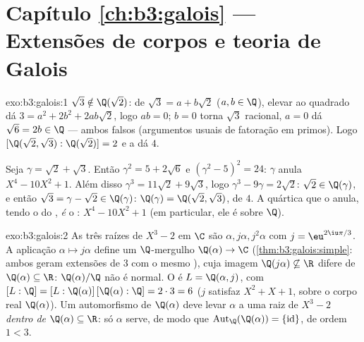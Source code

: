 \section*{Capítulo \ref{ch:b3:galois} --- Extensões de corpos e teoria de
Galois}

\begin{solution}{exo:b3:galois:1}
$\sqrt3 \notin \Q(\sqrt2)$: de $\sqrt3 = a + b\sqrt2$ ($a, b
\in \Q$), elevar ao quadrado dá $3 = a^2 + 2b^2 + 2ab\sqrt2$, logo $ab =
0$; $b = 0$
torna $\sqrt3$ racional, $a = 0$ dá $\sqrt6 = 2b
\in \Q$ --- ambos falsos
(argumentos usuais de fatoração em primos). Logo $[\Q(\sqrt2,\sqrt3) : \Q(\sqrt2)] = 2$ e a 
dá  $4$.

Seja $\gamma = \sqrt2 + \sqrt3$. Então $\gamma^2 = 5 + 2\sqrt6$ e
$(\gamma^2 - 5)^2 = 24$: $\gamma$ anula $X^4 - 10X^2 + 1$.
Além disso $\gamma^3 = 11\sqrt2 + 9\sqrt3$, logo $\gamma^3 - 9\gamma
= 2\sqrt2$: $\sqrt2 \in \Q(\gamma)$, e então $\sqrt3 = \gamma -
\sqrt2 \in \Q(\gamma)$: $\Q(\gamma) = \Q(\sqrt2,\sqrt3)$, de
 $4$. A quártica que o anula, tendo o  do , \emph{é} o : $X^4 -
10X^2 + 1$ (em particular, ele é  sobre $\Q$).
\end{solution}

\begin{solution}{exo:b3:galois:2}
As três raízes de $X^3 - 2$ em $\C$ são $\alpha, j\alpha,
j^2\alpha$ com $j = \eu^{2\iu\pi/3}$. A aplicação $\alpha \mapsto
j\alpha$ define um $\Q$-mergulho $\Q(\alpha) \to \C$
(\cref{thm:b3:galois:simple}: ambos geram extensões de  $3$
com o mesmo ), cuja imagem $\Q(j\alpha)
\not\subseteq \R$ difere de $\Q(\alpha) \subseteq \R$:
$\Q(\alpha)/\Q$ não é normal. O  é $L =
\Q(\alpha, j)$, com $[L:\Q] = [L:\Q(\alpha)]\,[\Q(\alpha):\Q] =
2 \cdot 3 = 6$ ($j$ satisfaz $X^2 + X + 1$,  sobre
o corpo real $\Q(\alpha)$). Um automorfismo de $\Q(\alpha)$
deve levar $\alpha$ a uma raiz de $X^3 - 2$ \emph{dentro de}
$\Q(\alpha) \subseteq \R$: só $\alpha$ serve, de modo que
$\operatorname{Aut}_\Q(\Q(\alpha)) = \{\mathrm{id}\}$, de ordem
$1 < 3$.
\end{solution}

